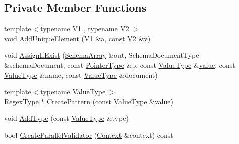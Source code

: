 \subsection*{Private Member Functions}
\begin{DoxyCompactItemize}
\item 
{\footnotesize template$<$typename V1 , typename V2 $>$ }\\void \mbox{\hyperlink{classrapidjson_1_1internal_1_1_schema_ac0c0c6dd5f20b50698a2cbc1095c3391}{Add\+Unique\+Element}} (V1 \&\mbox{\hyperlink{namespacerapidjson_a11fce64e721729aaf6be4a485c78f231}{a}}, const V2 \&v)
\item 
void \mbox{\hyperlink{classrapidjson_1_1internal_1_1_schema_a874c4f834613256a3b4c1f1cabcfe62d}{Assign\+If\+Exist}} (\mbox{\hyperlink{structrapidjson_1_1internal_1_1_schema_1_1_schema_array}{Schema\+Array}} \&out, Schema\+Document\+Type \&schema\+Document, const \mbox{\hyperlink{classrapidjson_1_1internal_1_1_schema_aa54c71c41aa8a9091565d12ffe27627c}{Pointer\+Type}} \&p, const \mbox{\hyperlink{classrapidjson_1_1internal_1_1_schema_a3979a9083c598195927c08c6e3ba91d1}{Value\+Type}} \&\mbox{\hyperlink{namespacerapidjson_a1a75d60792094d496b500c40776030dd}{value}}, const \mbox{\hyperlink{classrapidjson_1_1internal_1_1_schema_a3979a9083c598195927c08c6e3ba91d1}{Value\+Type}} \&name, const \mbox{\hyperlink{classrapidjson_1_1internal_1_1_schema_a3979a9083c598195927c08c6e3ba91d1}{Value\+Type}} \&document)
\item 
{\footnotesize template$<$typename Value\+Type $>$ }\\\mbox{\hyperlink{classrapidjson_1_1internal_1_1_schema_a2c16b06523df78f5c354e9a68da90e23}{Regex\+Type}} $\ast$ \mbox{\hyperlink{classrapidjson_1_1internal_1_1_schema_aaa59d7f839bdc9765b3fb58cbf3a4060}{Create\+Pattern}} (const \mbox{\hyperlink{classrapidjson_1_1internal_1_1_schema_a3979a9083c598195927c08c6e3ba91d1}{Value\+Type}} \&\mbox{\hyperlink{namespacerapidjson_a1a75d60792094d496b500c40776030dd}{value}})
\item 
void \mbox{\hyperlink{classrapidjson_1_1internal_1_1_schema_a84fb6f656ae61847b69af889441a751c}{Add\+Type}} (const \mbox{\hyperlink{classrapidjson_1_1internal_1_1_schema_a3979a9083c598195927c08c6e3ba91d1}{Value\+Type}} \&type)
\item 
bool \mbox{\hyperlink{classrapidjson_1_1internal_1_1_schema_aa8e9504b3e7bea6e6f6e80ea302c252d}{Create\+Parallel\+Validator}} (\mbox{\hyperlink{classrapidjson_1_1internal_1_1_schema_afca06b1f51d1bc18403bdf3f4d55ffef}{Context}} \&context) const
\item 

\end{DoxyCompactItemize}
